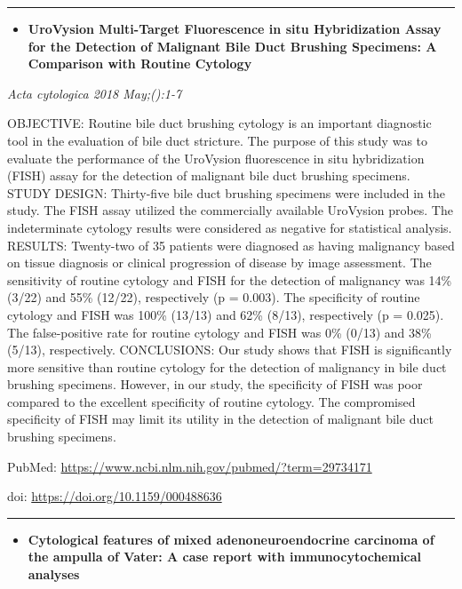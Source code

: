 \documentclass[]{article}
\providecommand{\tightlist}{%
  \setlength{\itemsep}{0pt}\setlength{\parskip}{0pt}}
\begin{document}
\begin{center}\rule{0.5\linewidth}{\linethickness}\end{center}

\begin{itemize}
\tightlist
\item
  \textbf{UroVysion Multi-Target Fluorescence in situ Hybridization
  Assay for the Detection of Malignant Bile Duct Brushing Specimens: A
  Comparison with Routine Cytology}
\end{itemize}

\emph{Acta cytologica 2018 May;():1-7}

OBJECTIVE: Routine bile duct brushing cytology is an important
diagnostic tool in the evaluation of bile duct stricture. The purpose of
this study was to evaluate the performance of the UroVysion fluorescence
in situ hybridization (FISH) assay for the detection of malignant bile
duct brushing specimens. STUDY DESIGN: Thirty-five bile duct brushing
specimens were included in the study. The FISH assay utilized the
commercially available UroVysion probes. The indeterminate cytology
results were considered as negative for statistical analysis. RESULTS:
Twenty-two of 35 patients were diagnosed as having malignancy based on
tissue diagnosis or clinical progression of disease by image assessment.
The sensitivity of routine cytology and FISH for the detection of
malignancy was 14\% (3/22) and 55\% (12/22), respectively (p = 0.003).
The specificity of routine cytology and FISH was 100\% (13/13) and 62\%
(8/13), respectively (p = 0.025). The false-positive rate for routine
cytology and FISH was 0\% (0/13) and 38\% (5/13), respectively.
CONCLUSIONS: Our study shows that FISH is significantly more sensitive
than routine cytology for the detection of malignancy in bile duct
brushing specimens. However, in our study, the specificity of FISH was
poor compared to the excellent specificity of routine cytology. The
compromised specificity of FISH may limit its utility in the detection
of malignant bile duct brushing specimens.

PubMed: \url{https://www.ncbi.nlm.nih.gov/pubmed/?term=29734171}

doi: \url{https://doi.org/10.1159/000488636}

{}

{}

\begin{center}\rule{0.5\linewidth}{\linethickness}\end{center}

\begin{itemize}
\tightlist
\item
  \textbf{Cytological features of mixed adenoneuroendocrine carcinoma of
  the ampulla of Vater: A case report with immunocytochemical analyses}
\end{itemize}
\end{document}
